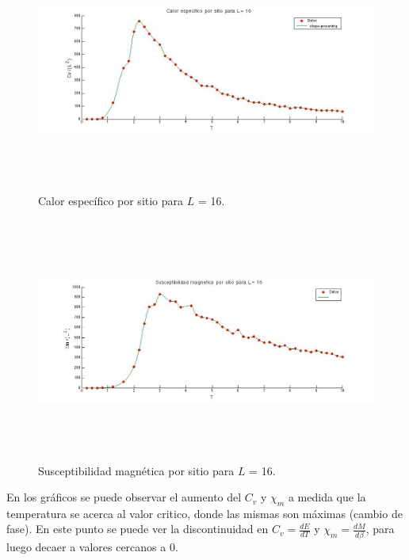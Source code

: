 \documentclass[a4paper,12pt]{article}
\begin{document}
\begin{figure}[H]
\begin{center}
\includegraphics[height=8cm]{../graficos/Cv_L16.jpg}
\caption[width=5cm]{Calor espec\'ifico por sitio para $L$ = 16.}
\end{center}
\end{figure}

\begin{figure}[H]
\begin{center}
\includegraphics[height=8cm]{../graficos/Xm_L16.jpg}
\caption[width=5cm]{Susceptibilidad magn\'etica por sitio para $L$ = 16.}
\end{center}
\end{figure}

En los gr\'aficos se puede observar el aumento del $C_{v}$ y $\chi_{m}$ a medida que la temperatura se acerca al valor critico, donde las mismas son m\'aximas (cambio de fase). En este punto se puede ver la discontinuidad en $C_{v} = \frac{dE}{dT}$ y $\chi_{m} = \frac{dM}{d\beta}$, para luego decaer a valores cercanos a 0.
\end{document}
